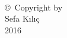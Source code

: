 
\thispagestyle{empty}
\hbox{\ }

\vfill
\renewcommand{\baselinestretch}{1}
\small\normalsize

\vspace{-.65in}

\begin{center}
\large{\copyright \hbox{ }Copyright by\\
Sefa Kılıç  %
\\
2016}
\end{center}

\vfill
